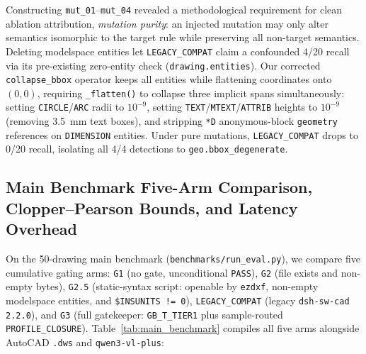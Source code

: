 \documentclass[nocopyright,nolists,upint,varvw,hyphenate]{asmejour}
\begin{document}
Constructing \texttt{mut\_01}--\texttt{mut\_04} revealed a methodological requirement for clean ablation attribution, \emph{mutation purity}: an injected mutation may only alter semantics isomorphic to the target rule while preserving all non-target semantics. Deleting modelspace entities let \texttt{LEGACY\_COMPAT} claim a confounded 4/20 recall via its pre-existing zero-entity check (\texttt{drawing.entities}). Our corrected \texttt{collapse\_bbox} operator keeps all entities while flattening coordinates onto $(0,0)$, requiring \texttt{\_flatten()} to collapse three implicit spans simultaneously: setting \texttt{CIRCLE}/\texttt{ARC} radii to $10^{-9}$, setting \texttt{TEXT}/\texttt{MTEXT}/\texttt{ATTRIB} heights to $10^{-9}$ (removing 3.5~mm text boxes), and stripping \texttt{*D} anonymous-block \texttt{geometry} references on \texttt{DIMENSION} entities. Under pure mutations, \texttt{LEGACY\_COMPAT} drops to 0/20 recall, isolating all 4/4 detections to \texttt{geo.bbox\_degenerate}.

\subsection{Main Benchmark Five-Arm Comparison, Clopper--Pearson Bounds, and Latency Overhead}\label{sec:main_results}

On the 50-drawing main benchmark (\texttt{benchmarks/run\_eval.py}), we compare five cumulative gating arms: \texttt{G1} (no gate, unconditional \texttt{PASS}), \texttt{G2} (file exists and non-empty bytes), \texttt{G2.5} (static-syntax script: openable by \texttt{ezdxf}, non-empty modelspace entities, and \texttt{\$INSUNITS != 0}), \texttt{LEGACY\_COMPAT} (legacy \texttt{dsh-sw-cad 2.2.0}), and \texttt{G3} (full gatekeeper: \texttt{GB\_T\_TIER1} plus sample-routed \texttt{PROFILE\_CLOSURE}). Table~\ref{tab:main_benchmark} compiles all five arms alongside AutoCAD \texttt{.dws} and \texttt{qwen3-vl-plus}:
\end{document}
